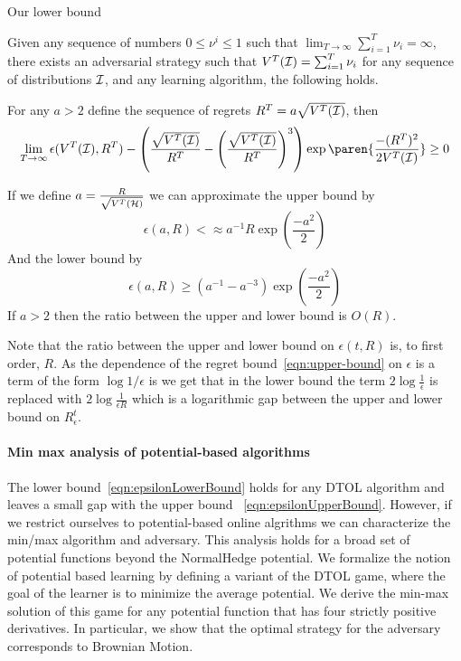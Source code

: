 \documentclass[anon,12pt]{colt2024} %
\begin{document}
Our lower bound 
\begin{theorem} \label{thm:LowerBound}
  Given any sequence of numbers
  $0 \leq \nu^i \leq 1$ such that
  $\lim_{T \to \infty} \sum_{i=1}^T \nu_i = \infty$, there exists an
  adversarial strategy such that $V^T({\cal I}) = \sum_{i=1}^T \nu_i$
  for any sequence of distributions ${\cal I}$, and any learning
  algorithm, the following holds.

  For any $a>2$ define the sequence of regrets $R^T = a \sqrt{V^T({\cal I)}}$, then
  \begin{equation} \label{eqn:epsilonLowerBound}
    \lim_{T \to \infty}\epsilon(V^T({\cal I}),R^T) -
    \left(\frac{\sqrt{V^T({\cal I})}}{R^T} -  \left( \frac{\sqrt{V^T({\cal I})}}{R^T} \right)^3 \right) \exp \paren{\frac{-(R^T)^2}{2V^T({\cal I})}} \geq 0
  \end{equation}
\end{theorem}

If we define $a=\frac{R}{\sqrt{V^T({\cal H})}}$ we can approximate the upper bound by 
\[
\epsilon(a,R) < \approx a^{-1}R \exp\left(\frac{-a^2}{2} \right) 
\]
And the lower bound by
\[
  \epsilon(a,R) \geq (a^{-1}-a^{-3}) \exp\left(\frac{-a^2}{2} \right)
\]
If $a>2$ then the ratio between the upper and lower bound is $O(R)$.


Note that the ratio between the upper and lower bound on
$\epsilon(t,R)$ is, to first order, $R$. As the dependence of the
regret bound~\ref{eqn:upper-bound} on $\epsilon$ is a term of the form
$\log 1/\epsilon$ is we get that in the lower bound the term
$2\log \frac{1}{\epsilon}$ is replaced with
$2 \log \frac{1}{\epsilon R}$ which is a logarithmic gap between the
upper and lower bound on $R^t_\epsilon$.

\paragraph{Min max analysis of potential-based algorithms}
The lower bound~\ref{eqn:epsilonLowerBound} holds for any DTOL
algorithm and leaves a small gap with the upper bound
~\ref{eqn:epsilonUpperBound}. However, if we restrict ourselves to
potential-based online algrithms we can characterize the min/max
algorithm and adversary. This analysis holds for a broad set of
potential functions beyond the NormalHedge potential.  We formalize
the notion of potential based learning by defining a variant of the
DTOL game, where the goal of the learner is to minimize the average
potential. We derive the min-max solution of this game for any
potential function that has four strictly positive derivatives. In
particular, we show that the optimal strategy for the adversary
corresponds to Brownian Motion.
\end{document}
